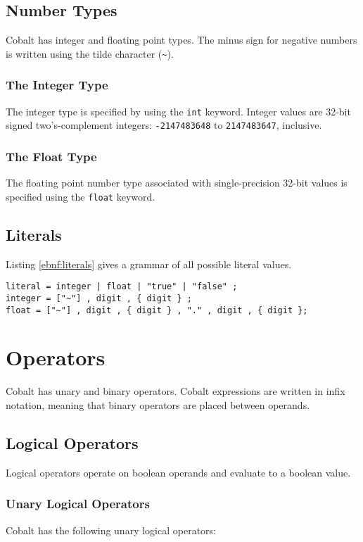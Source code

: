\documentclass[a4paper,appendixprefix]{scrreprt}
\begin{document}
\section{Number Types}
Cobalt has integer and floating point types. The minus sign for negative numbers is written using the tilde character (\verb!~!).

\subsection{The Integer Type}
The integer type is specified by using the \verb!int! keyword. Integer values are 32-bit signed two's-complement integers: \verb!-2147483648! to \verb!2147483647!, inclusive.

\subsection{The Float Type}
The floating point number type associated with single-precision 32-bit values is specified using the \verb!float! keyword.

\section{Literals}
Listing \ref{ebnf:literals} gives a grammar of all possible literal values.

\begin{lstlisting}[label={ebnf:literals},caption={Literals Grammar}]
literal = integer | float | "true" | "false" ;
integer = ["~"] , digit , { digit } ;
float = ["~"] , digit , { digit } , "." , digit , { digit };
\end{lstlisting}

\chapter{Operators}\label{operators}
Cobalt has unary and binary operators. Cobalt expressions are written in infix notation, meaning that binary operators are placed between operands.

\section{Logical Operators}
Logical operators operate on boolean operands and evaluate to a boolean value.

\subsection{Unary Logical Operators}
Cobalt has the following unary logical operators:
\end{document}
